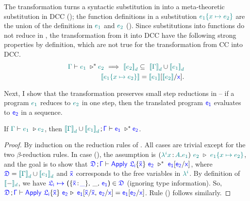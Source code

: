 The transformation turns a syntactic substitution in {\ccs} into a meta-theoretic substitution in DCC (); the function definitions in a substitution $\helper{e_1\hsub{e_2}{x}}$ are the union of the definitions in $\helper{e_1}$ and $\helper{e_2}$ (). 
Since substitutions into functions do not reduce in {\ccs}, the transformation from it into DCC have the following strong properties by definition, which are not true for the transformation from CC into DCC.
\begin{align}
	\label{reduction def}
	\helper{\Gamma} \vdash \helper{e_1}\ \triangleright^* \helper{e_2}\ \Longrightarrow\ \helper{\bbracket{e_2}_d} \subseteq\ \helper{\bbracket{\Gamma}_d} \cup \helper{\bbracket{e_1}_d}\\
	\label{ccs substitution}
	\hbracket{\helper{e_1\hsub{e_2}{x}}} = \hbracket{\helper{e_1}}\sub{\hbracket{\helper{e_2}}}{\target{x}}.
\end{align}

Next, I show that the transformation preserves small step reductions in {\ccs} -- if a {\ccs} program $\helper{e_1}$ reduces to $\helper{e_2}$ in one step, then the translated program $\target{e_1}$ evaluates to $\target{e_2}$ in a sequence.
\begin{lemma} If $\helper{\Gamma} \vdash \helper{e_1}\ \triangleright \helper{e_2}$, then
$\helper{\bbracket{\Gamma}_d} \cup \helper{\bbracket{e_1}_d} \semicolon \target{\Gamma} \vdash \target{e_1}\ \triangleright^* \target{e_2}$.
\begin{proof}
By induction on the reduction rules of {\ccs}. All cases are trivial except for the two $\beta$-reduction rules. In case (), the assumption is 
$(\helper{\lambda^i x} \goodcolon \helper{A} . \helper{e_1})\ \helper{e_2}\ \triangleright\ \helper{e_1\hsub{e_2}{x}}$, and the goal is to show that 
$\target{\fdef} \semicolon \target{\Gamma} \vdash
\target{Apply}\ \targetlab{\flabel_i}{\bar{x}}\ \target{e_2}\ \triangleright^* \ \target{e_1}\targetsub{e_2}{x}$, where
$\target{\fdef} = \helper{\bbracket{\Gamma}_d} \cup \helper{\bbracket{e_1}_d}$ and $\target{\bar{x}}$ corresponds to the free variables in $\helper{\lambda^i}$. By definition of $\hbracketd{-}$, we have
$\itemdef{\target{\flabel_i}}{\itemtype{\bar{x}}{\_}}{\_}{\target{e_1}} \in \target{\fdef}$ (ignoring type information).
So, 
$\target{\fdef} \semicolon \target{\Gamma} \vdash
\target{Apply}\ \targetlab{\flabel_i}{\bar{x}}\ \target{e_2}\ \triangleright$
$ 
\target{e_1}[\target{\bar{x}}\slash\target{\bar{x}}\sfcomma\target{e_2}\slash\target{x}]
= \target{e_1}\targetsub{e_2}{x}
$.
Rule () follows similarly.
\end{proof}
\end{lemma}

